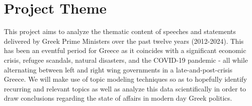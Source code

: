 \section{Project Theme}
\label{sec:Introduction}

This project aims to analyze the thematic content of speeches and statements delivered by Greek Prime Ministers over the past twelve years (2012-2024). This has been an eventful period for Greece as it coincides with a significant economic crisis, refugee scandals, natural disasters, and the COVID-19 pandemic - all while alternating between  left and right wing governments in a late-and-post-crisis Greece. We will make use of topic modeling techniques so as to hopefully identify recurring and relevant topics as well as analyze this data scientifically in order to draw conclusions regarding the state of affairs in modern day Greek politics.
